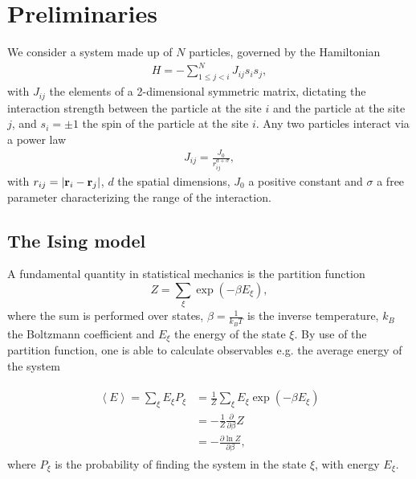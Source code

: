 \section{Preliminaries}

We consider a system made up of $N$ particles, governed by the Hamiltonian
\begin{align}
	H = -\sum^N_{1\le j < i} J_{ij} s_i s_j,
	\label{eq:connected-Hamiltonian}
\end{align}
with $J_{ij}$ the elements of a 2-dimensional symmetric matrix, dictating the interaction strength between the particle at the site $i$ and the particle at the site $j$, and $s_i = \pm 1$ the spin of the particle at the site $i$.
Any two particles interact via a power law
\begin{align}
	J_{ij} =  \frac{J_0}{r^{d+\sigma}_{ij}},
\end{align}
with $r_{ij} = \lvert \textbf{r}_i - \textbf{r}_j \rvert$, $d$ the spatial dimensions, $J_0$ a positive constant and $\sigma$ a free parameter characterizing the range of the interaction. 

\subsection{The Ising model}

A fundamental quantity in statistical mechanics is the partition function \[
	Z = \sum_\xi \exp (-\beta E_{\xi}),
\]
where the sum is performed over states, $\beta =  \frac{1}{k_B T}$ is the inverse temperature, $k_B$ the Boltzmann coefficient and $E_\xi$ the energy of the state $\xi$. By use of the partition function, one is able to calculate observables e.g. the average energy of the system 

\begin{align}
	\begin{split}
	\left< E\right> = 	\sum_\xi E_\xi P_\xi &=  \frac{1}{Z}\sum_\xi E_\xi \exp{(-\beta E_\xi)} \\
									   &= - \frac{1}{Z} \frac{\partial }{\partial \beta } Z \\
									   &= - \frac{\partial \ln Z}{\partial \beta},
	\end{split}
\end{align}
where $P_\xi$ is the probability of finding the system in the state $\xi$, with energy $E_\xi$.

